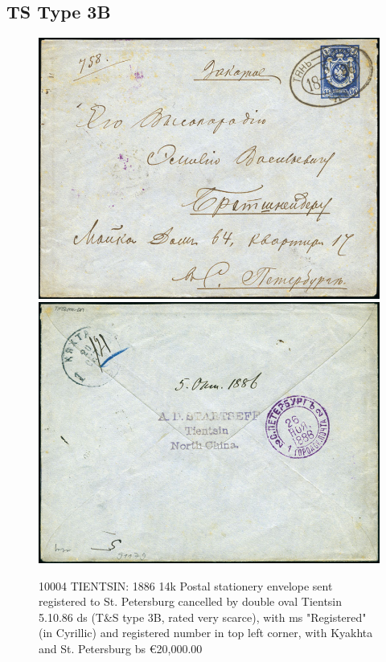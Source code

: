 \subsection{TS Type 3B}
\begin{figure}[htbp]
\centering
\includegraphics[width=.95\textwidth]{../russian-post-offices-in-china/10004.jpg}
\includegraphics[width=.95\textwidth]{../russian-post-offices-in-china/10004-1.jpg}
\caption{
10004	TIENTSIN: 1886 14k Postal stationery envelope sent registered 
to St. Petersburg cancelled by double oval Tientsin 5.10.86 ds 
(T\&S type 3B, rated very scarce), with ms "Registered" (in Cyrillic)
and registered number in top left corner, with Kyakhta and St. Petersburg bs
\euro 20,000.00 
}  
\end{figure}


